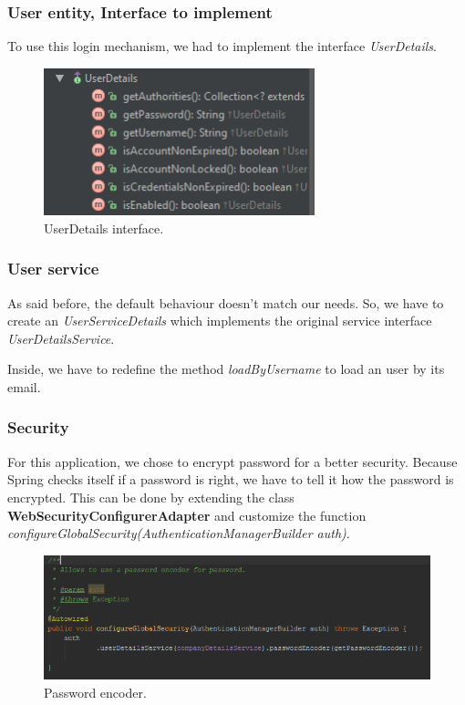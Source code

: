 \subsubsection{User entity, Interface to implement}
To use this login mechanism, we had to implement the interface \textit{UserDetails}. 

\begin{figure}[H]
  \caption{UserDetails interface.}
  \centering
    \includegraphics[width=0.7\textwidth]{img/userdetails.png}
\end{figure}

\subsubsection{User service}
As said before, the default behaviour doesn't match our needs. So, we have to create an \textit{UserServiceDetails} which implements the original service interface \textit{UserDetailsService}.

Inside, we have to redefine the method \textit{loadByUsername} to load an user by its email. 

\subsubsection{Security}
For this application, we chose to encrypt password for a better security. Because Spring checks itself if a password is right, we have to tell it how the password is encrypted. This can be done by extending the class \textbf{WebSecurityConfigurerAdapter} and customize the function \textit{configureGlobalSecurity(AuthenticationManagerBuilder auth)}.


\begin{figure}[H]
  \caption{Password encoder.}
  \centering
    \includegraphics[width=1\textwidth]{img/passwordencoder.png}
\end{figure}




